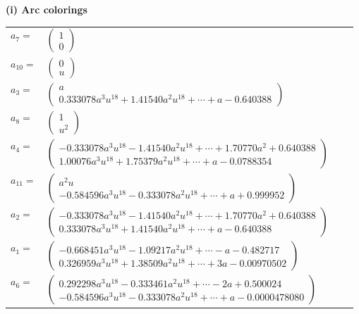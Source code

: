 \documentclass[1p]{elsarticle_modified}
\theoremstyle{definition}
\begin{document}
\flushleft \textbf{(i) Arc colorings}\\
\begin{tabular}{m{7pt} m{180pt} m{7pt} m{180pt} }
\flushright $a_{7}=$&$\begin{pmatrix}1\\0\end{pmatrix}$ \\
\flushright $a_{10}=$&$\begin{pmatrix}0\\u\end{pmatrix}$ \\
\flushright $a_{3}=$&$\begin{pmatrix}a\\0.333078 a^{3} u^{18}+1.41540 a^{2} u^{18}+\cdots+a-0.640388\end{pmatrix}$ \\
\flushright $a_{8}=$&$\begin{pmatrix}1\\u^2\end{pmatrix}$ \\
\flushright $a_{4}=$&$\begin{pmatrix}-0.333078 a^{3} u^{18}-1.41540 a^{2} u^{18}+\cdots+1.70770 a^{2}+0.640388\\1.00076 a^{3} u^{18}+1.75379 a^{2} u^{18}+\cdots+a-0.0788354\end{pmatrix}$ \\
\flushright $a_{11}=$&$\begin{pmatrix}a^2 u\\-0.584596 a^{3} u^{18}-0.333078 a^{2} u^{18}+\cdots+a+0.999952\end{pmatrix}$ \\
\flushright $a_{2}=$&$\begin{pmatrix}-0.333078 a^{3} u^{18}-1.41540 a^{2} u^{18}+\cdots+1.70770 a^{2}+0.640388\\0.333078 a^{3} u^{18}+1.41540 a^{2} u^{18}+\cdots+a-0.640388\end{pmatrix}$ \\
\flushright $a_{1}=$&$\begin{pmatrix}-0.668451 a^{3} u^{18}-1.09217 a^{2} u^{18}+\cdots-a-0.482717\\0.326959 a^{3} u^{18}+1.38509 a^{2} u^{18}+\cdots+3 a-0.00970502\end{pmatrix}$ \\
\flushright $a_{6}=$&$\begin{pmatrix}0.292298 a^{3} u^{18}-0.333461 a^{2} u^{18}+\cdots-2 a+0.500024\\-0.584596 a^{3} u^{18}-0.333078 a^{2} u^{18}+\cdots+a-0.0000478080\end{pmatrix}$ \\

\end{tabular}
\end{document}
